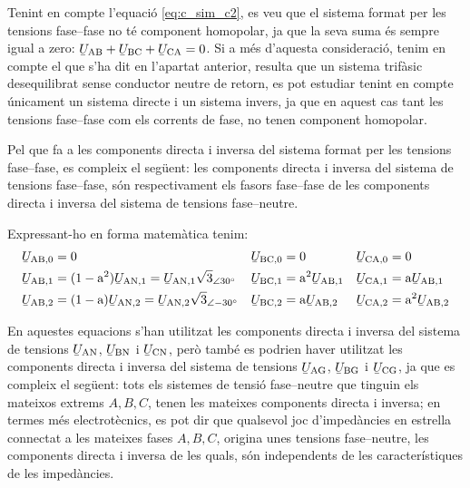 \begin{center}
    
    \label{pic:Comp_sim_tens}
\end{center}

Tenint en compte l'equació \eqref{eq:c_sim_c2}, es veu que el sistema
format per les tensions fase--fase no té component homopolar, ja que
la seva suma  és sempre igual a zero: $\cmplx{U}\ped{AB} +
\cmplx{U}\ped{BC} + \cmplx{U}\ped{CA} = 0$. Si a més
d'aquesta consideració, tenim en compte el que s'ha dit en l'apartat
anterior, resulta que un sistema trifàsic desequilibrat sense conductor
neutre de retorn, es pot estudiar tenint en compte únicament un sistema directe
i un sistema invers, ja que en aquest cas tant les tensions fase--fase com els
corrents de fase, no tenen component homopolar.

Pel que fa a les components directa i inversa del sistema format per
les tensions fase--fase, es compleix el següent: les components
directa i inversa del sistema de tensions fase--fase, són
respectivament els fasors fase--fase de les components directa i
inversa del sistema de tensions fase--neutre.

Expressant-ho en forma matemàtica tenim:
\begin{subequations}
\begin{align}
   \cmplx{U}\ped{AB,0} &= 0 &
   \cmplx{U}\ped{BC,0} &= 0 &
   \cmplx{U}\ped{CA,0} &= 0 \\
   \cmplx{U}\ped{AB,1} &= (1-\au^2) \cmplx{U}\ped{AN,1} =
   \cmplx{U}\ped{AN,1} \sqrt{3}_{\angle\ang{30}} &
   \cmplx{U}\ped{BC,1} &= \au^2 \cmplx{U}\ped{AB,1} &
   \cmplx{U}\ped{CA,1} &= \au \cmplx{U}\ped{AB,1} \label{eq:c_sim_a3} \\
   \cmplx{U}\ped{AB,2} &= (1-\au) \cmplx{U}\ped{AN,2}  =
   \cmplx{U}\ped{AN,2} \sqrt{3}_{\angle\ang{-30}}&
   \cmplx{U}\ped{BC,2} &= \au \cmplx{U}\ped{AB,2} &
   \cmplx{U}\ped{CA,2} &= \au^2 \cmplx{U}\ped{AB,2} \label{eq:c_sim_b3}
\end{align}
\end{subequations}

En aquestes equacions s'han utilitzat les components directa i
inversa del sistema de tensions
$\cmplx{U}\ped{AN}$, $\cmplx{U}\ped{BN}$ i $\cmplx{U}\ped{CN}$,
però també es podrien haver utilitzat les components directa i
inversa del sistema de tensions
$\cmplx{U}\ped{AG}$, $\cmplx{U}\ped{BG}$ i $\cmplx{U}\ped{CG}$,
ja que es compleix el següent: tots els sistemes de tensió
fase--neutre que tinguin els mateixos extrems $A, B,
C$, tenen les mateixes components directa i inversa; en termes
més electrotècnics, es pot dir que qualsevol joc d'impedàncies en
estrella connectat a les mateixes fases $A, B, C$,
origina unes tensions fase--neutre, les components directa i inversa
de les quals, són independents de les característiques de les
impedàncies.

